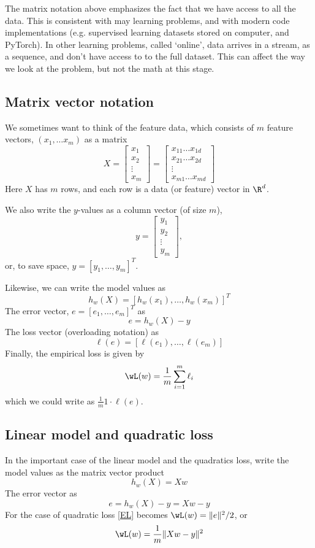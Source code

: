 \documentclass[12pt]{amsart}
\begin{document}
\begin{remark}
The matrix notation above emphasizes the fact that we have access to all the data.  This is consistent with may learning problems, and with modern code implementations (e.g. supervised learning datasets stored on computer, and PyTorch).  In other learning problems, called `online', data arrives in a stream, as a sequence, and don't have access to to the full dataset.  This can affect the way we look at the problem, but not the math at this stage. 
\end{remark}


\subsection{Matrix vector notation}
We sometimes want to think of the feature data, which consists of $m$ feature vectors, $(x_1, \dots x_m)$ as a matrix
\[
X = 
\left[
\begin{matrix}
  x_1 \\
  x_2 \\
  \vdots \\
  x_m
\end{matrix}
\right ]
= 
\left[
\begin{matrix}
  x_{11} \dots x_{1d} \\
  x_{21} \dots x_{2d} \\
  \vdots \\
  x_{m1} \dots x_{md}
\end{matrix}
\right ]
\]
Here $X$ has $m$ rows, and each row is a data (or feature) vector in $\R^d$. 

We also write the $y$-values as a column vector (of size $m$), 
\[
y = 
\left [
\begin{matrix}
  y_1 \\
  y_2 \\
  \vdots \\
  y_m
\end{matrix}
\right ],
\]
or, to save space, $y = [y_1, \dots, y_m]^T$. 

Likewise, we can write the model values as
\[
h_w(X) = [h_w(x_1), \dots, h_w(x_m)]^T
\]
The error vector, $e = [e_1, \dots, e_m]^T 
$
as
\[
e = h_w(X)-y
\]
The loss vector (overloading notation) as 
\[
\ell(e) = [\ell(e_1), \dots, \ell(e_m)]
\]
Finally, the empirical loss is given by
\[
\wL(w) = \frac 1 m \sum_{i=1}^m \ell_i
\]
which we could write as $\frac 1 m 1\cdot \ell(e)$. 

\subsection{Linear model and quadratic loss}
In the important case of the linear model and the quadratics loss, 
write the model values as the matrix vector product
\[
h_w(X) = Xw
\]
The error vector as
\[
e = h_w(X)-y = Xw-y
\]
For the case of quadratic loss \eqref{EL} becomes $\wL(w) = \| e \|^2/2$, or 
\begin{equation}\label{vector_regression_loss}
	\wL(w) = \frac 1 m \|Xw-y\|^2
\end{equation}
\end{document}
